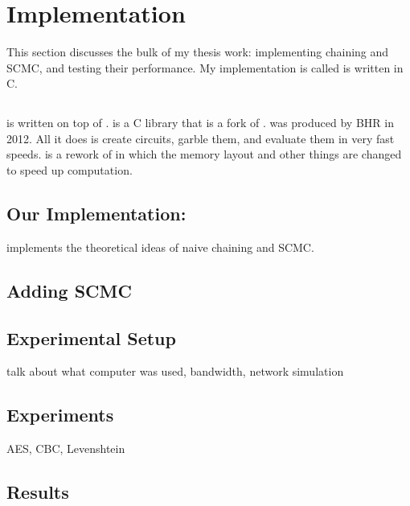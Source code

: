 \chapter{Implementation}

This section discusses the bulk of my thesis work: implementing chaining and SCMC, and testing their performance.
My implementation is called \CompGC is written in C.

\section{\LibGarble}
 \CompGC is written on top of \LibGarble.
\LibGarble is a C library that is a fork of \JustGarble.
\JustGarble was produced by BHR in 2012.
All it does is create circuits, garble them, and evaluate them in very fast speeds.
\LibGarble is a rework of \JustGarble in which the memory layout and other things are changed to speed up computation.

\section{Our Implementation: \CompGC}
\CompGC implements the theoretical ideas of naive chaining and SCMC.



\section{Adding SCMC}
\section{Experimental Setup}
talk about what computer was used, bandwidth, network simulation
\section{Experiments}
AES, CBC, Levenshtein
\section{Results}
